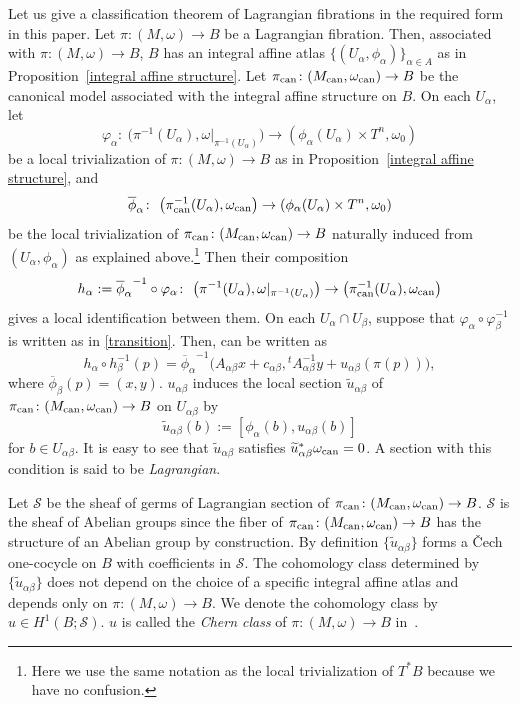 \documentclass[pdftex]{sigma}
\numberwithin{equation}{section}
\newcommand{\SCS}{\mathscr S}
\renewcommand{\tilde}{\widetilde}
\begin{document}
Let us give a classification theorem of Lagrangian fibrations in the required form in this paper.
Let $\pi\colon (M,\omega)\to B$ be a Lagrangian fibration. Then, associated with $\pi\colon (M,\omega)\to B$, $B$ has an integral affine atlas $\{ (U_\alpha,\phi_\alpha)\}_{\alpha\in A}$ as in Proposition~\ref{integral affine structure}. Let $\pi_{\rm can}\colon (M_{\rm can},\omega_{\rm can})\to B$ be the canonical model associated with the integral affine structure on $B$. On each $U_\alpha$, let
\[
\varphi_\alpha\colon \ \bigl(\pi^{-1}(U_\alpha),\omega|_{\pi^{-1}(U_\alpha)}\bigr)\to (\phi_\alpha(U_\alpha)\times T^n,\omega_0)
\]
 be a local trivialization of $\pi\colon (M,\omega)\to B$ as in Proposition~\ref{integral affine structure}, and
 \[
 \overline\phi_\alpha\colon \ \bigl(\pi_{\rm can}^{-1}(U_\alpha), \omega_{\rm can}\bigr)\to (\phi_\alpha(U_\alpha)\times T^n,\omega_0)
 \]
 be the local trivialization of $\pi_{\rm can}\colon (M_{\rm can},\omega_{\rm can})\to B$ naturally induced from $(U_\alpha,\phi_\alpha)$ as explained above.\footnote{Here we use the same notation as the local trivialization of $T^*B$ because we have no confusion.} Then their composition
\[
h_\alpha:={\overline\phi_\alpha}^{-1}\circ \varphi_\alpha\colon\ \bigl(\pi^{-1}(U_\alpha),\omega|_{\pi^{-1}(U_\alpha)}\bigr)\to \bigl(\pi_{\rm can}^{-1}(U_\alpha), \omega_{\rm can}\bigr)
\]
gives a local identification between them.
%
On each $U_\alpha\cap U_\beta$, suppose that $\varphi_\alpha\circ\varphi_\beta^{-1}$ is written as in \eqref{transition}. Then,  can be written as
\[
h_\alpha\circ h_\beta^{-1}(p)={\overline\phi_\alpha}^{-1}\bigl(A_{\alpha\beta}x+c_{\alpha\beta},{}^tA_{\alpha\beta}^{-1}y+u_{\alpha\beta}(\pi(p))\bigr),
\]
where $\overline\phi_\beta(p)=(x,y)$. $u_{\alpha\beta}$ induces the local section $\tilde u_{\alpha\beta}$ of $\pi_{\rm can}\colon (M_{\rm can},\omega_{\rm can})\to B$ on $U_{\alpha\beta}$ by
\[
\tilde u_{\alpha\beta}(b):=[\phi_\alpha(b),u_{\alpha\beta}(b)]
\]
for $b\in U_{\alpha\beta}$. It is easy to see that $\tilde u_{\alpha\beta}$ satisfies $\tilde u_{\alpha\beta}^*\omega_{\rm can}=0$. A section with this condition is said to be \emph{Lagrangian}.

Let $\SCS$ be the sheaf of germs of Lagrangian section of $\pi_{\rm can}\colon (M_{\rm can},\omega_{\rm can})\to B$. $\SCS$ is the sheaf of Abelian groups since the fiber of $\pi_{\rm can}\colon (M_{\rm can},\omega_{\rm can})\to B$ has the structure of an Abelian group by construction. By definition $\{ \tilde u_{\alpha\beta}\}$ forms a \v{C}ech one-cocycle on $B$ with coefficients in $\SCS$. The cohomology class determined by $\{ \tilde u_{\alpha\beta}\}$ does not depend on the choice of a specific integral affine atlas and depends only on $\pi\colon (M,\omega)\to B$. We denote the cohomology class by~${u \in H^1(B;\SCS)}$.
$u$ is called the \emph{Chern class} of $\pi\colon (M,\omega)\to B$ in~\cite{Du}.
\end{document}
